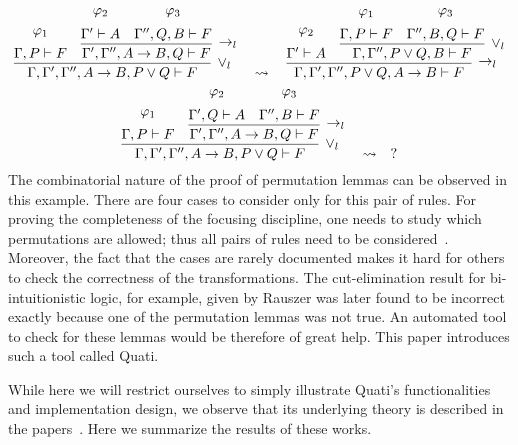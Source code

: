 \documentclass{llncs}
\begin{document}
{\scriptsize
\[
\infer[\vee_l]{\Gamma, \Gamma', \Gamma'', A \rightarrow B , P \vee Q \vdash F}{
  \deduce{\Gamma, P \vdash F}{\varphi_1\vspace{0.2cm}}
  &
  \infer[\rightarrow_l]{\Gamma', \Gamma'', A \rightarrow B , Q \vdash F}{
    \deduce{\Gamma' \vdash A}{\varphi_2\vspace{0.2cm}}
    &
    \deduce{\Gamma'', Q, B \vdash F}{\varphi_3\vspace{0.2cm}}
  }
}
\quad\rightsquigarrow\quad
\infer[\rightarrow_l]{\Gamma, \Gamma', \Gamma'', P \vee Q, A \rightarrow B
\vdash F}{
  \deduce{\Gamma' \vdash A}{\varphi_2\vspace{0.2cm}}
  &
  \infer[\vee_l]{\Gamma, \Gamma'', P \vee Q, B \vdash F}{
    \deduce{\Gamma, P \vdash F}{\varphi_1\vspace{0.2cm}}
    &
    \deduce{\Gamma'', B, Q \vdash F}{\varphi_3\vspace{0.2cm}}
  }
}
\]
}
{\scriptsize
\[
\infer[\vee_l]{\Gamma, \Gamma', \Gamma'', A \rightarrow B , P \vee Q \vdash F}{
  \deduce{\Gamma, P \vdash F}{\varphi_1\vspace{0.2cm}}
  &
  \infer[\rightarrow_l]{\Gamma', \Gamma'', A \rightarrow B , Q \vdash F}{
    \deduce{\Gamma', Q \vdash A}{\varphi_2\vspace{0.2cm}}
    &
    \deduce{\Gamma'', B \vdash F}{\varphi_3\vspace{0.2cm}}
  }
}
\quad\rightsquigarrow\quad
?
\]
}%
The combinatorial nature of the proof of permutation lemmas can be observed in
this example. There are four cases to consider only for this pair of rules. For
proving the completeness of the focusing discipline, one needs to study which
permutations are allowed; thus all pairs of rules need to be
considered~\cite{miller07cslb}.
Moreover, the fact that the cases are rarely documented makes it hard for others to check the
correctness of the transformations. The cut-elimination result for
bi-intuitionistic logic, for example, given by Rauszer \cite{rauszer74studia}
was later found to be incorrect \cite{crolard01tcs} exactly because one of the
permutation lemmas was not true. An automated tool to check for these lemmas
would be therefore of great help. This paper introduces such a tool called Quati.

While here we will restrict ourselves to simply illustrate Quati's
functionalities and implementation design, we observe that its underlying theory
is described in the papers~\cite{nigam.jlc,nigam13iclp,nigam14ebl}. Here we
summarize the results of these works.
 
\end{document}
